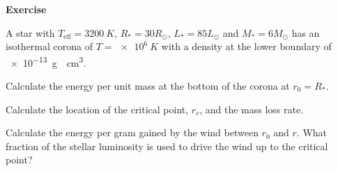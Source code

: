 \documentclass[main.tex]{subfiles}
\begin{document}
\begin{greenbox}
    \textbf{Exercise}

  A star with \(T _{\text{eff}} = \SI{3200}{K}\), \(R_{*} = 30 R_{\odot}\), \(L_{*} = 85 L_{\odot}\) and \(M_{*} = 6 M_{\odot}\) has an isothermal corona of \(T = \SI{e6}{K}\) with a density at the lower boundary of \SI{e-13}{g \per\centi\metre\cubed}.

  Calculate the energy per unit mass at the bottom of the corona at \(r_0 = R_{*}\).

  Calculate the location of the critical point, \(r_c\), and the mass loss rate.

  Calculate the energy per gram gained by the wind between \(r_0 \) and \(r\). What fraction of the stellar luminosity is used to drive the wind up to the critical point?
\end{greenbox}
\end{document}
